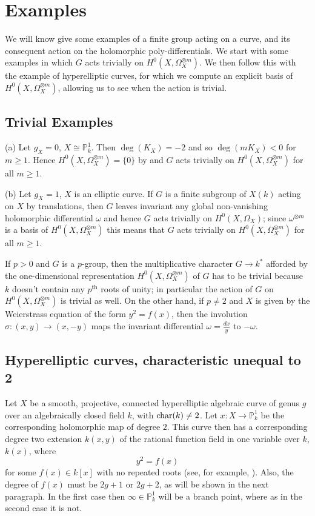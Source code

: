 \section{Examples}
We will know give some examples of a finite group acting on a curve, and its consequent action on the holomorphic poly-differentials. 
We start with some examples in which $G$ acts trivially on $H^0(X,\Omega_X^{\otimes m})$.
We then follow this with the example of hyperelliptic curves, for which we compute an explicit basis of $H^0(X,\Omega_X^{\otimes m})$, allowing us to see when the action is trivial.


\subsection{Trivial Examples}\label{examplessection}


(a) Let $g_X = 0$, \ie $X\cong \mathbb P_k^1$.
Then $\deg(K_X) = -2$ and so $\deg(mK_X) < 0$ for $m\geq 1$.
Hence $H^0(X,\Omega_X^{\otimes m}) =\{0\}$ by \cite[Lem. 2, pg. 295]{hart} and $G$ acts trivially on $H^0(X,\Omega_X^{\otimes m})$ for all $m\geq 1$.

(b) Let $g_X = 1$, \ie $X$ is an elliptic curve.
If $G$ is a finite subgroup of $X(k)$ acting on $X$ by translations, then $G$ leaves invariant any global non-vanishing holomorphic differential $\omega$ and hence $G$ acts trivially on $H^0(X,\Omega_X)$;
since $\omega^{\otimes m}$ is a basis of $H^0(X,\Omega_X^{\otimes m})$ this means that $G$ acts trivially on $H^0(X,\Omega_X^{\otimes m})$ for all $m\geq 1$.

If $p>0$ and $G$ is a $p$-group, then the multiplicative character $G\rightarrow k^*$ afforded by the one-dimensional representation $H^0(X,\Omega_X^{\otimes m})$ of $G$ has to be trivial because $k$ doesn't contain any $p^{\mbox{th}}$ roots of unity;
in particular the action of $G$ on $H^0(X,\Omega_X^{\otimes m})$ is trivial as well.
On the other hand, if $p\neq 2$ and $X$ is given by the Weierstrass equation of the form $y^2 = f(x)$, then the involution $\sigma : (x,y) \rightarrow (x,-y)$ maps the invariant differential $\omega = \frac{dx}{y}$ to $-\omega$.


\subsection{Hyperelliptic curves, characteristic unequal to 2}\label{charneq2}
Let $X$ be a smooth, projective, connected hyperelliptic algebraic curve of genus $g$ over an algebraically closed field $k$, with $\operatorname{char} (k) \neq 2$.
Let $x:X\rightarrow \mathbb{P}_k^1$ be the corresponding holomorphic map of degree $2$.
This curve then has a corresponding degree two extension $k(x,y)$ of the rational function field in one variable over $k$, $k(x)$, where
   \begin{equation}\label{definingequation}
   y^2 = f(x)
   \end{equation}
for some $f(x)\in k[x]$ with no repeated roots (see, for example, \cite[Rem. 7.4.25]{liu}).
Also, the degree of $f(x)$ must be $2g+1$ or $2g+2$, as will be shown in the next paragraph.
In the first case then $\infty \in \mathbb P_k^1$ will be a branch point, where as in the second case it is not.


